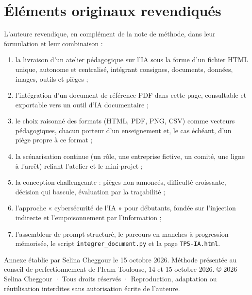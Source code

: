 \documentclass[11pt,a4paper]{article}
\newcommand{\auteure}{Selina Cheggour}
\newcommand{\droits}{© 2026 \auteure{} · Tous droits réservés · Reproduction, adaptation ou réutilisation interdites sans autorisation écrite de l'auteure}
\newcommand{\presente}{Méthode présentée au conseil de perfectionnement de l'Icam Toulouse, 14 et 15 octobre 2026}
\begin{document}
\section{Éléments originaux revendiqués}

L'auteure revendique, en complément de la note de méthode, dans leur formulation et leur
combinaison :
\begin{enumerate}
\item la livraison d'un atelier pédagogique sur l'IA sous la forme d'un fichier HTML unique,
autonome et centralisé, intégrant consignes, documents, données, images, outils et pièges ;
\item l'intégration d'un document de référence PDF dans cette page, consultable et exportable
vers un outil d'IA documentaire ;
\item le choix raisonné des formats (HTML, PDF, PNG, CSV) comme vecteurs pédagogiques, chacun
porteur d'un enseignement et, le cas échéant, d'un piège propre à ce format ;
\item la scénarisation continue (un rôle, une entreprise fictive, un comité, une ligne à
l'arrêt) reliant l'atelier et le mini-projet ;
\item la conception challengeante : pièges non annoncés, difficulté croissante, décision qui
bascule, évaluation par la traçabilité ;
\item l'approche « cybersécurité de l'IA » pour débutants, fondée sur l'injection indirecte et
l'empoisonnement par l'information ;
\item l'assembleur de prompt structuré, le parcours en manches à progression mémorisée, le
script \texttt{integrer\_document.py} et la page \texttt{TP5-IA.html}.
\end{enumerate}

\vfill
\begin{cadregris}
\small Annexe établie par \auteure{} le 15 octobre 2026. \presente. \droits.
\end{cadregris}
\end{document}
